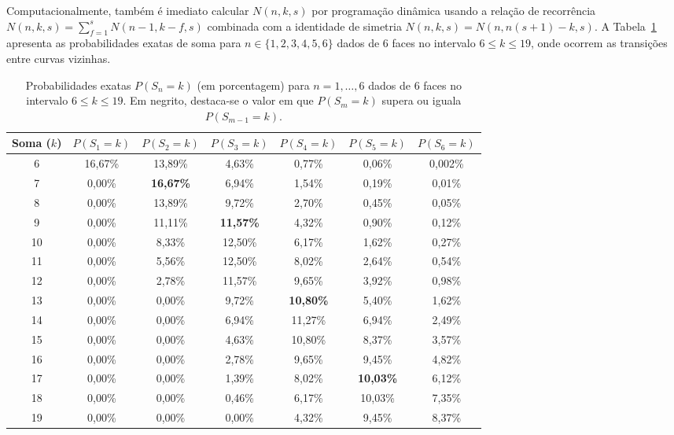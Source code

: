 \documentclass[11pt,a4paper]{article}
\theoremstyle{definition}
\theoremstyle{remark}
\begin{document}
Computacionalmente, também é imediato calcular $N(n, k, s)$ por programação dinâmica usando a relação de recorrência $N(n, k, s) = \sum_{f=1}^s N(n-1, k-f, s)$ combinada com a identidade de simetria $N(n, k, s) = N(n, n(s+1) - k, s)$. A Tabela~\ref{tab:distribuicao_1a6} apresenta as probabilidades exatas de soma para $n \in \{1, 2, 3, 4, 5, 6\}$ dados de $6$ faces no intervalo $6 \le k \le 19$, onde ocorrem as transições entre curvas vizinhas.

\begin{table}[H]
\centering
\caption{Probabilidades exatas $P(S_n = k)$ (em porcentagem) para $n = 1, \dots, 6$ dados de $6$ faces no intervalo $6 \le k \le 19$. Em negrito, destaca-se o valor em que $P(S_m = k)$ supera ou iguala $P(S_{m-1} = k)$.}
\label{tab:distribuicao_1a6}
\vspace{0.3em}
\small
\begin{tabular}{@{}ccccccc@{}}
\toprule
\textbf{Soma ($k$)} & \textbf{$P(S_1 = k)$} & \textbf{$P(S_2 = k)$} & \textbf{$P(S_3 = k)$} & \textbf{$P(S_4 = k)$} & \textbf{$P(S_5 = k)$} & \textbf{$P(S_6 = k)$} \\
\midrule
6  & 16,67\% & 13,89\% &  4,63\% &  0,77\% &  0,06\% & 0,002\% \\
7  &  0,00\% & \textbf{16,67\%} &  6,94\% &  1,54\% &  0,19\% & 0,01\%  \\
8  &  0,00\% & 13,89\% &  9,72\% &  2,70\% &  0,45\% & 0,05\%  \\
9  &  0,00\% & 11,11\% & \textbf{11,57\%} &  4,32\% &  0,90\% & 0,12\%  \\
10 &  0,00\% &  8,33\% & 12,50\% &  6,17\% &  1,62\% & 0,27\%  \\
11 &  0,00\% &  5,56\% & 12,50\% &  8,02\% &  2,64\% & 0,54\%  \\
12 &  0,00\% &  2,78\% & 11,57\% &  9,65\% &  3,92\% & 0,98\%  \\
13 &  0,00\% &  0,00\% &  9,72\% & \textbf{10,80\%} &  5,40\% & 1,62\%  \\
14 &  0,00\% &  0,00\% &  6,94\% & 11,27\% &  6,94\% & 2,49\%  \\
15 &  0,00\% &  0,00\% &  4,63\% & 10,80\% &  8,37\% & 3,57\%  \\
16 &  0,00\% &  0,00\% &  2,78\% &  9,65\% &  9,45\% & 4,82\%  \\
17 &  0,00\% &  0,00\% &  1,39\% &  8,02\% & \textbf{10,03\%} & 6,12\%  \\
18 &  0,00\% &  0,00\% &  0,46\% &  6,17\% & 10,03\% & 7,35\%  \\
19 &  0,00\% &  0,00\% &  0,00\% &  4,32\% &  9,45\% & 8,37\%  \\
\bottomrule
\end{tabular}
\end{table}
\end{document}
